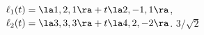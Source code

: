 {$\ell_1(t) = \la 1,2,1\ra + t\la 2,-1,1\ra$,\\
$\ell_2(t) = \la 3,3,3\ra + t\la 4,2,-2\ra$.
}
{$3/\sqrt{2}$
}

